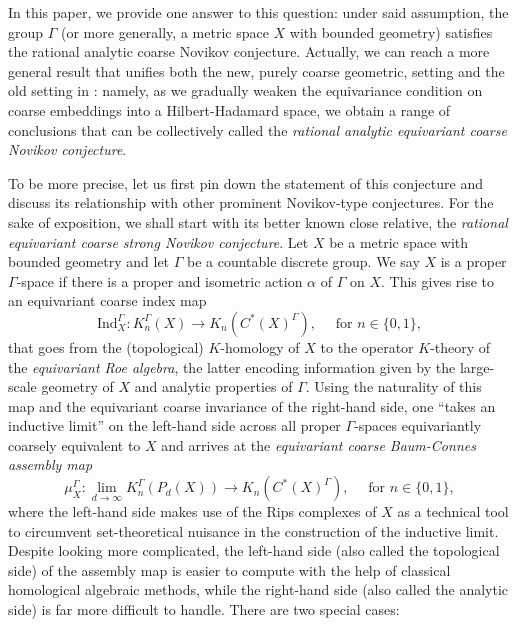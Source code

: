 \documentclass[11pt]{article}
\theoremstyle{definition}
\theoremstyle{plain}
\def\Ga{\Gamma}
\begin{document}
In this paper, we provide one answer to this question: under said assumption, the group $\Gamma$ (or more generally, a metric space $X$ with bounded geometry) satisfies the rational analytic coarse Novikov conjecture. 
Actually, we can reach a more general result that unifies both the new, purely coarse geometric, setting and the old setting in \cite{GWY2018}: namely, as we gradually weaken the equivariance condition on coarse embeddings into a Hilbert-Hadamard space, we obtain a range of conclusions that can be collectively called the \emph{rational analytic equivariant coarse Novikov conjecture}. 

To be more precise, let us first pin down the statement of this conjecture and discuss its relationship with other prominent Novikov-type conjectures. For the sake of exposition, we shall start with its better known close relative, the \emph{rational equivariant coarse strong Novikov conjecture}. 
Let $X$ be a metric space with bounded geometry and let $\Ga$ be a countable discrete group. We say $X$ is a proper $\Ga$-space if there is a proper and isometric action $\alpha$ of $\Ga$ on $X$. 
This gives rise to an equivariant coarse index map 
$$\mathrm{Ind}_X^{\Ga}: K_n^{\Ga}(X)\to K_n(C^*(X)^{\Ga}) , \quad \text{ for } n \in \{0,1\} ,$$
that goes from the (topological) $K$-homology of $X$ to the operator $K$-theory of the \emph{equivariant Roe algebra}, the latter encoding information given by the large-scale geometry of $X$ and analytic properties of $\Ga$. 
Using the naturality of this map and the equivariant coarse invariance of the right-hand side, one ``takes an inductive limit'' on the left-hand side across all proper $\Ga$-spaces equivariantly coarsely equivalent to $X$ and arrives at the \emph{equivariant coarse Baum-Connes assembly map}
$$\mu_X^{\Ga}:\lim_{d\to\infty}K_n^{\Ga}(P_d(X))\to K_n(C^*(X)^{\Ga}) , \quad \text{ for } n \in \{0,1\} ,$$
where the left-hand side makes use of the Rips complexes of $X$ as a technical tool to circumvent set-theoretical nuisance in the construction of the inductive limit. 
Despite looking more complicated, the left-hand side (also called the topological side) of the assembly map is easier to compute with the help of classical homological algebraic methods, while the right-hand side (also called the analytic side) is far more difficult to handle. 
There are two special cases: 
\end{document}
